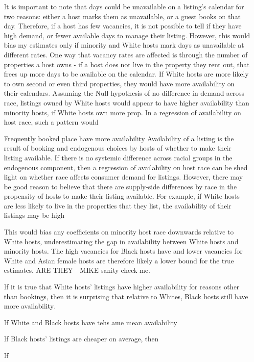 It is important to note that days could be unavailable on a listing's calendar for two reasons: either a host marks them as unavailable, or a guest books on that day. Therefore, if a host has few vacancies, it is not possible to tell if they have high demand, or fewer available days to manage their listing. However, this would bias my estimates only if minority and White hosts mark days as unavailable at different rates. One way that vacancy rates are affected is through the number of properties a host owns - if a host does not live in the property they rent out, that frees up more days to be available on the calendar. If White hosts are more likely to own second or even third properties, they would have more availability on their calendars. Assuming the Null hypothesis of no difference in demand across race, listings owned by White hosts would appear to have higher availability than minority hosts, if White hosts own more prop. In a regression of availability on host race, such a pattern would 

Frequently booked place have more availability 
Availability of a listing is the result of booking and endogenous choices by hosts of whether to make their listing available. If there is no systemic difference across racial groups in the endogenous component, then a regression of availability on host race can be shed light on whether race affects consumer demand for listings. However, there may be good reason to believe that there are supply-side differences by race in the propensity of hosts to make their listing available. For example, if White hosts are less likely to live in the properties that they list, the availability of their listings may be high 

This would bias any coefficients on minority host race downwards relative to White hosts, underestimating the gap in availability between White hosts and minority hosts. The high vacancies for Black hosts have and lower vacancies for White and Asian female hosts are therefore likely a lower bound for the true estimates. ARE THEY - MIKE sanity check me. 

If it is true that White hosts' listings have higher availability for reasons other than bookings, then it is surprising that relative to Whites, Black hosts still have more availability. 

If White and Black hosts have tehs ame mean availability 

If Black hosts' listings are cheaper on average, then 

If 

